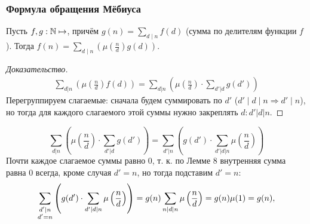 \begin{frame}[t]
    \frametitle{\normalsize \bf Формула обращения Мёбиуса}
    \setcounter{theorem}{19}

    \begin{theorem}[ФОМ]
        Пусть $f,g: \mathbb{N} \mapsto $, причём $g(n) = \sum\limits_{d \mid n} f(d)$ (сумма по делителям функции $f$). Тогда $f(n) = \sum\limits_{d \mid n} \left( \mu(\frac{n}{d}) g(d) \right) $.
    \end{theorem}

    \begin{proof}[Доказательство]
        \renewcommand{\qedsymbol}{}
        \begin{align*}
            \sum_{d | n} \left( \mu \left( \frac{n}{d} \right)  f(d) \right) = \sum_{d | n} \left( \mu\left(\frac{n}{d}\right) \cdot \sum_{d'| d}^{} g(d') \right) 
        \end{align*}
        Перегруппируем слагаемые: сначала будем суммировать по $d'$ ($d' \mid d \mid n \Rightarrow d' \mid n$), но тогда для каждого слагаемого этой суммы нужно закреплять $d: d' | d | n$. 
    \end{proof}
    
\end{frame}
\begin{frame}[t]
    \[
        \sum_{d | n} \left( \mu\left(\frac{n}{d}\right) \cdot \sum_{d'| d}^{} g(d') \right) = \sum_{d' | n}^{} \left( g(d') \cdot \sum_{d' | d | n}^{} \mu \left( \frac{n}{d} \right)  \right)
    \]
    Почти каждое слагаемое суммы равно 0, т. к. по Лемме 8 внутренняя сумма равна 0 всегда, кроме случая $d' = n$, но тогда подставим $d' = n$: \[
        \sum_{\substack{d' | n  \\ d' = n}}^{} \left( g(d') \cdot \sum_{d' | d | n}^{} \mu \left( \frac{n}{d} \right)  \right) = g(n) \sum_{n | d | n}^{} \mu \left( \frac{n}{d} \right) = g(n) \mu (1) = g(n), \qedsymbol
    \]
\end{frame}

